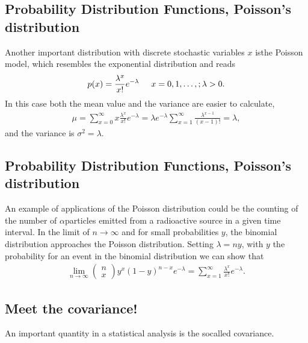 \documentclass[letterpaper,10pt,english]{sphinxmanual}
\begin{document}
\subsection{Probability Distribution Functions, Poisson’s  distribution}
\label{\detokenize{chapter2:probability-distribution-functions-poisson-s-distribution}}
Another important distribution with discrete stochastic variables \(x\) isthe Poisson model, which resembles the exponential distribution and reads
\begin{equation*}
\begin{split}
p(x) = \frac{\lambda^x}{x!} e^{-\lambda} \hspace{0.5cm}x=0,1,\dots,;\lambda > 0.
\end{split}
\end{equation*}
In this case both the mean value and the variance are easier to calculate,
\begin{equation*}
\begin{split}
\mu = \sum_{x=0}^{\infty} x \frac{\lambda^x}{x!} e^{-\lambda} = \lambda e^{-\lambda}\sum_{x=1}^{\infty}
\frac{\lambda^{x-1}}{(x-1)!}=\lambda,
\end{split}
\end{equation*}
and the variance is \(\sigma^2=\lambda\).


\subsection{Probability Distribution Functions, Poisson’s  distribution}
\label{\detokenize{chapter2:id3}}
An example of applications of the Poisson distribution could be the counting
of the number of \(\alpha\)\sphinxhyphen{}particles emitted from a radioactive source in a given time interval.
In the limit of \(n\rightarrow \infty\) and for small probabilities \(y\), the binomial distribution
approaches the Poisson distribution. Setting \(\lambda = ny\), with \(y\) the probability for an event in
the binomial distribution we can show that
\begin{equation*}
\begin{split}
\lim_{n\rightarrow \infty}\left(\begin{array}{c} n \\ x\end{array}\right)y^x(1-y)^{n-x} e^{-\lambda}=\sum_{x=1}^{\infty}\frac{\lambda^x}{x!} e^{-\lambda}.
\end{split}
\end{equation*}

\subsection{Meet the  covariance!}
\label{\detokenize{chapter2:meet-the-covariance}}
An important quantity in a statistical analysis is the so\sphinxhyphen{}called covariance.
\end{document}
